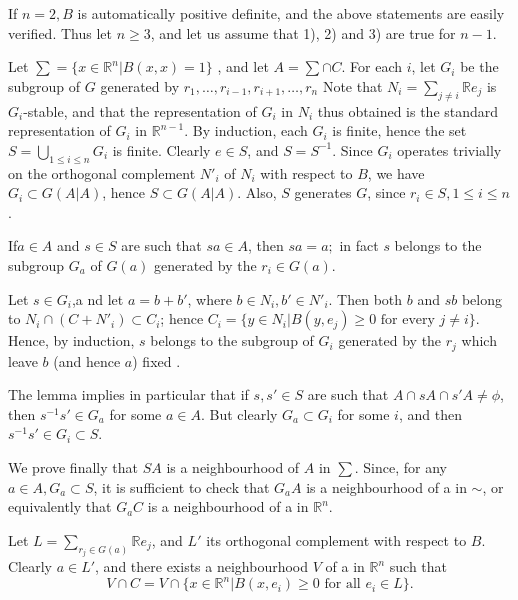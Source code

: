    If $n=2,B$ is automatically positive definite, and the above
   statements are easily verified.  Thus  let $n \ge 3$, and let us
   assume that 1), 2) and 3) are true for $n-1$. 
   
   Let $\sum = \bigg\{x \in  \mathbb{R}^n \big| B(x,x)=1\bigg\}$ ,
   and let $A= \sum \cap C$. For  each $i$, let $G_i$ be the subgroup
   of $G$ generated by $r_1, \ldots, r_{i-1}, r_{i+1}, \ldots ,  r_n$ Note that
   $N_i = \sum\limits_{j \neq i} \mathbb{R} e_j$ is $G_i$-stable, and
   that the  representation of $G_i$ in $N_i$ thus obtained  is the
   standard representation of $G_i$ in $\mathbb{R}^{n-1}$. By
   induction, each $G_i$ is finite, hence the set $S=
   \bigcup\limits_{1 \le  i \le n} G_i$ is finite. Clearly $e \in S$,
   and $S=S^{-1}$. Since $G_i$ operates trivially  on the orthogonal
   complement $N'_i$ of $N_i$ with respect to $B$, we have $G_i
   \subset G(A|A)$, hence $S\subset G(A|A)$. Also, $S$ generates $G$,
   since $r_i \in S,
   1 \le i \le n$. 
   
\begin{lemma*}
  If\pageoriginale $a \in  A$ and $s \in S$ are  such that $s a \in
  A$, then $sa=a;$ 
  in  fact $s$ belongs to the subgroup $G_a$ of  $G(a)$ generated by the
  $r_i \in G(a)$. 
\end{lemma*}   

\begin{proofofthelemma*}
  Let $s \in G_i$,a nd let $a=b+b'$, where  $b \in N_i, b' \in
  N'_i$. Then both $b$ and $sb$ belong to $N_i \cap(C+N'_i) \subset
  C_i$; hence $C_i = \bigg\{ y \in  N_i \big| B(y, e_j) \ge 0\text{ for
    every } j \neq i \bigg\}$. Hence, by induction,  $s$ belongs to
  the subgroup of 
  $G_i$ generated  by the  $r_j$ which leave  $b$ (and hence $a$) fixed .   
\end{proofofthelemma*}   

The lemma  implies in particular that if $s, s' \in S$ are such that
   $A \cap sA \cap  s' A \neq \phi$, then $s^{-1} s'  \in G_a$ for
   some $a \in  A$. But clearly $G_a \subset G_i$ for some $i$, and
   then $s^{-1} s' \in G_i \subset S$. 
   
   We prove finally that $SA$ is a neighbourhood of $A$ in $\sum$.
   Since, for any $ a \in A, G_a \subset S$, it is sufficient to check that
   $G_a A$ is a neighbourhood of a in $\sim$, or equivalently that
   $G_aC$ is a neighbourhood of a in $\mathbb{R}^n$.  
   
   Let $L = \sum\limits_{r_j  \in G(a)} \mathbb{R} e_j$, and $L'$ its
   orthogonal complement with  respect to $B$.  Clearly $a \in  L'$,
   and there exists a neighbourhood $V$ of a in $\mathbb{R}^n$ such
   that 
   $$
   V \cap C= V \cap  \bigg\{x \in \mathbb{R}^n\big| B(x, e_i) \ge 0
   \text{ for all } e_i \in L \bigg\}. 
   $$
   
